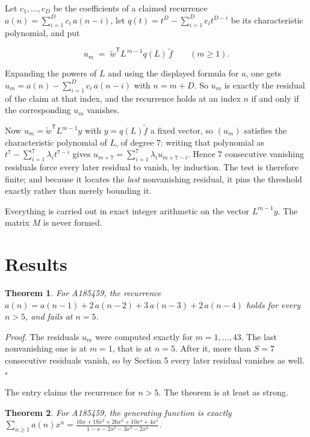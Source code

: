 \documentclass[11pt]{article}
\newtheorem{theorem}{Theorem}
\theoremstyle{definition}
\begin{document}
Let $c_1,\dots,c_D$ be the coefficients of a claimed recurrence $a(n) = \sum_{i=1}^{D} c_i\,a(n-i)$, let $q(t) = t^{D} - \sum_{i=1}^{D} c_i t^{D-i}$ be its characteristic polynomial, and put

\[u_m \;=\; \tilde w^{\mathsf T} L^{\,m-1} q(L)\,\tilde f \qquad (m \ge 1).\]

Expanding the powers of $L$ and using the displayed formula for $a$, one gets $u_m = a(n) - \sum_{i=1}^{D} c_i\,a(n-i)$ with $n = m + D$. So $u_m$ is exactly the residual of the claim at that index, and the recurrence holds at an index $n$ if and only if the corresponding $u_m$ vanishes.

Now $u_m = \tilde w^{\mathsf T} L^{m-1} y$ with $y = q(L)\tilde f$ a fixed vector, so $(u_m)$ satisfies the characteristic polynomial of $L$, of degree $7$: writing that polynomial as $t^{7} - \sum_{i=1}^{7} \lambda_i t^{7-i}$ gives $u_{m+7} = \sum_{i=1}^{7} \lambda_i u_{m+7-i}$. Hence $7$ consecutive vanishing residuals force every later residual to vanish, by induction. The test is therefore finite; and because it locates the {\itshape last} nonvanishing residual, it pins the threshold exactly rather than merely bounding it.

Everything is carried out in exact integer arithmetic on the vector $L^{m-1}y$. The matrix $M$ is never formed.

\section{Results}

\begin{theorem} For A185459, the recurrence $a(n) = a(n-1) + 2\,a(n-2) + 3\,a(n-3) + 2\,a(n-4)$ holds for every $n > 5$, and fails at $n = 5$.\end{theorem}

{\itshape Proof.} The residuals $u_m$ were computed exactly for $m = 1,\dots,43$. The last nonvanishing one is at $m = 1$, that is at $n = 5$. After it, more than $S = 7$ consecutive residuals vanish, so by Section 5 every later residual vanishes as well. $\square$

The entry claims the recurrence for $n > 5$. The theorem is at least as strong.

\begin{theorem} For A185459, the generating function is exactly $\sum_{n\ge 1} a(n)x^n = \frac{16x + 18x^{2} + 26x^{3} + 10x^{4} + 4x^{5}}{1 - x - 2x^{2} - 3x^{3} - 2x^{4}}$.\end{theorem}
\end{document}
